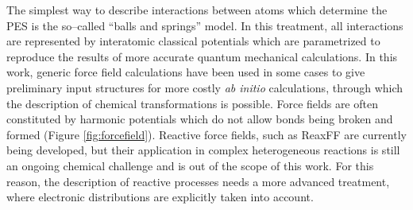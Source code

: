 The simplest way to describe interactions between atoms which determine the PES is the so--called ``balls and springs'' model. In this treatment, all interactions are represented by interatomic classical potentials which are parametrized to reproduce the results of more accurate quantum mechanical calculations. In this work, generic force field calculations have been used in some cases to give preliminary input structures for more costly \textit{ab initio} calculations, through which the description of chemical transformations is possible. 
Force fields are often constituted by harmonic potentials which do not allow bonds being broken and formed (Figure \ref{fig:forcefield}). Reactive force fields, such as ReaxFF \cite{VanDuin2001} are currently being developed, but their application in complex heterogeneous reactions is still an ongoing chemical challenge and is out of the scope of this work. For this reason, the description of reactive processes needs a more advanced treatment, where electronic distributions are explicitly taken into account.

